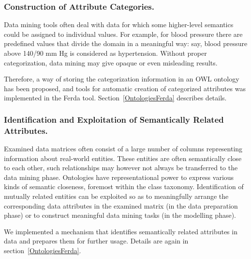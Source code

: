 \subsubsection{Construction of Attribute Categories.}

Data mining tools often deal with data for which some higher-level semantics could be assigned to individual values.
For example, for blood pressure there are predefined values that divide the domain in a meaningful way: say, blood pressure above 140/90 mm Hg is considered as hypertension. 
Without proper categorization, data mining may give opaque or even misleading results.

Therefore, a way of storing the categorization information in an OWL ontology has been proposed, and tools for automatic creation of categorized attributes was implemented in the Ferda tool. 
Section~\ref{OntologiesFerda} describes details.

\subsubsection{Identification and Exploitation of Semantically Related Attributes.}

Examined data matrices often consist of a large number of columns representing information about real-world entities. 
These entities are often semantically close to each other, such relationships may however not always be transferred to the data mining phase.
Ontologies have representational power to express various kinds of semantic closeness, foremost within the class taxonomy. 
Identification of mutually related entities can be exploited so as to meaningfully arrange the corresponding data attributes in the examined matrix (in the data preparation phase) or to construct meaningful data mining tasks (in the modelling phase). 

We implemented a mechanism that identifies semantically related attributes in data and prepares them for further usage. 
Details are again in section~\ref{OntologiesFerda}.


